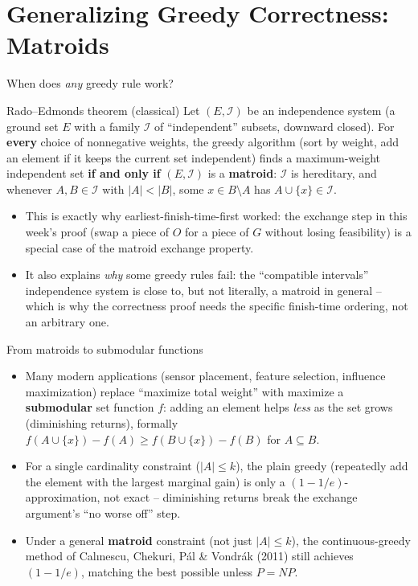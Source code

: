 \documentclass[11pt,aspectratio=169]{beamer}
\begin{document}
\section{Generalizing Greedy Correctness: Matroids}

\begin{frame}{When does \emph{any} greedy rule work?}
  \begin{block}{Rado--Edmonds theorem (classical)}
    Let $(E, \mathcal{I})$ be an independence system (a ground set $E$ with a family
    $\mathcal{I}$ of ``independent'' subsets, downward closed). For \textbf{every}
    choice of nonnegative weights, the greedy algorithm (sort by weight, add an element
    if it keeps the current set independent) finds a maximum-weight independent set
    \textbf{if and only if} $(E, \mathcal{I})$ is a \textbf{matroid}: $\mathcal{I}$ is
    hereditary, and whenever $A, B \in \mathcal{I}$ with $|A| < |B|$, some $x \in
    B\setminus A$ has $A \cup \{x\} \in \mathcal{I}$.
  \end{block}
  \begin{itemize}
    \item This is exactly why earliest-finish-time-first worked: the exchange step in
    this week's proof (swap a piece of $O$ for a piece of $G$ without losing
    feasibility) is a special case of the matroid exchange property.
    \item It also explains \emph{why} some greedy rules fail: the ``compatible
    intervals'' independence system is close to, but not literally, a matroid in
    general -- which is why the correctness proof needs the specific finish-time
    ordering, not an arbitrary one.
  \end{itemize}
\end{frame}

\begin{frame}{From matroids to submodular functions}
  \begin{itemize}
    \item Many modern applications (sensor placement, feature selection, influence
    maximization) replace ``maximize total weight'' with maximize a
    \textbf{submodular} set function $f$: adding an element helps \emph{less} as the
    set grows (diminishing returns), formally $f(A\cup\{x\}) - f(A) \ge f(B\cup\{x\}) -
    f(B)$ for $A \subseteq B$.
    \item For a single cardinality constraint ($|A|\le k$), the plain greedy
    (repeatedly add the element with the largest marginal gain) is only a
    $(1-1/e)$-approximation, not exact -- diminishing returns break the exchange
    argument's ``no worse off'' step.
    \item Under a general \textbf{matroid} constraint (not just $|A|\le k$), the
    continuous-greedy method of Cal\i nescu, Chekuri, P\'al \& Vondr\'ak (2011) still
    achieves $(1-1/e)$, matching the best possible unless $P=NP$.
  \end{itemize}
\end{frame}
\end{document}
